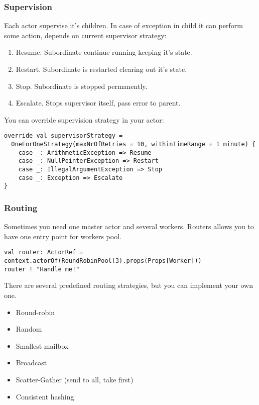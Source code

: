 \begin{frame}[fragile]
\frametitle{Supervision}
Each actor supervise it's children.  In case of exception in child it can perform some action,
depends on current supervisor strategy:
\begin{enumerate}
\item Resume. Subordinate continue running keeping it's state.
\item Restart. Subordinate is restarted clearing out it's state.
\item Stop. Subordinate is stopped permanently.
\item Escalate. Stops supervisor itself, pass error to parent.
\end{enumerate}
You can override supervision strategy in your actor:
\begin{lstlisting}
override val supervisorStrategy =
  OneForOneStrategy(maxNrOfRetries = 10, withinTimeRange = 1 minute) {
    case _: ArithmeticException => Resume
    case _: NullPointerException => Restart
    case _: IllegalArgumentException => Stop
    case _: Exception => Escalate
}
\end{lstlisting}
\end{frame}

\begin{frame}[fragile]
\frametitle{Routing}
Sometimes you need one master actor and several workers.  Routers allows you to have one
entry point for workers pool.
\begin{lstlisting}
val router: ActorRef = context.actorOf(RoundRobinPool(3).props(Props[Worker]))
router ! "Handle me!"
\end{lstlisting}
There are several predefined routing strategies, but you can implement your own one.
\begin{itemize}
\item Round-robin
\item Random
\item Smallest mailbox
\item Broadcast
\item Scatter-Gather (send to all, take first)
\item Consistent hashing
\end{itemize}
\end{frame}

